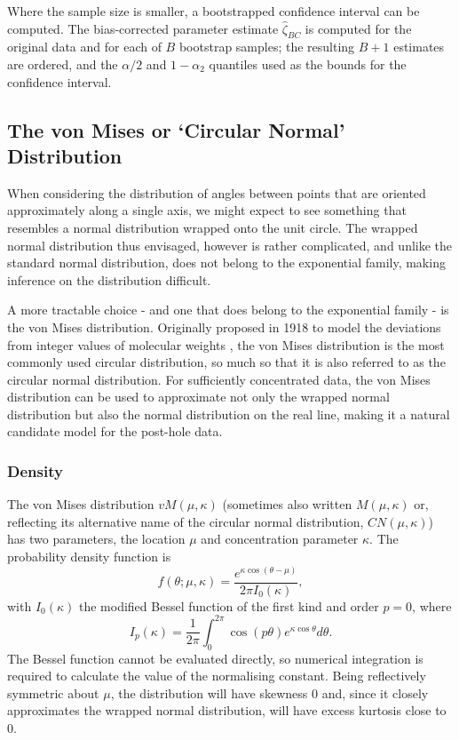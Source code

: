 \documentclass[../../ArchStats.tex]{subfiles}
\begin{document}
Where the sample size is smaller, a bootstrapped confidence interval can be computed. The bias-corrected parameter estimate $\hat{\zeta}_{BC}$ is computed for the original data and for each of $B$ bootstrap samples; the resulting $B+1$ estimates are ordered, and the $\alpha/2$ and $1- \alpha_2$ quantiles used as the bounds for the confidence interval.



\subsection{The von Mises or `Circular Normal' Distribution}
\label{sec:vonMises}

When considering the distribution of angles between points that are oriented approximately along a single axis, we might expect to see something that resembles a normal distribution wrapped onto the unit circle. The wrapped normal distribution thus envisaged, however is rather complicated, and unlike the standard normal distribution, does not belong to the exponential family, making inference on the distribution difficult.

A more tractable choice - and one that does belong to the exponential family - is the von Mises distribution. Originally proposed in 1918 to model the deviations from integer values of molecular weights \cite{VonMises1918}, the von Mises distribution is the most commonly used circular distribution, so much so that it is also referred to as the circular normal distribution. For sufficiently concentrated data, the von Mises distribution can be used to approximate not only the wrapped normal distribution but also the normal distribution on the real line, making it a natural candidate model for the post-hole data.

\subsubsection{Density}
The von Mises distribution $vM(\mu, \kappa)$ (sometimes also written $M(\mu, \kappa)$ or, reflecting its alternative name of the circular normal distribution, $CN(\mu, \kappa)$) has two parameters, the location $\mu$ and concentration parameter $\kappa$. The probability density function is
	\begin{equation}
	\label{eq:vM-density}
	f(\theta; \mu, \kappa) = \frac{e^{\kappa \cos(\theta - \mu)}}{2\pi I_0(\kappa)},	
	\end{equation}
with $I_0(\kappa)$ the modified Bessel function of the first kind and order $p=0$, where
	\begin{equation}
	\label{eq:mod-Bessel}
	I_p(\kappa) = \frac{1}{2\pi}\int_0^{2\pi} \cos(p\theta)e^{\kappa \cos \theta} d\theta.
	\end{equation}
The Bessel function cannot be evaluated directly, so numerical integration is required to calculate the value of the normalising constant. Being reflectively symmetric about $\mu$, the distribution will have skewness 0 and, since it closely approximates the wrapped normal distribution, will have excess kurtosis close to 0. 
\end{document}
